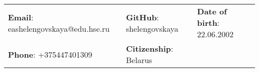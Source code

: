 \documentclass[letterpaper, 11pt]{article}
\begin{document}


\vspace{0.5cm} 
\begin{center}
\begin{tabular}{lll}
\textbf{Email}: eashelengovskaya@edu.hse.ru      &
\hspace{0.1in} \textbf{GitHub}: shelengovskaya    &
\hspace{0.1in} 	\textbf{Date of birth}: 22.06.2002 \\

\textbf{Phone}: +375447401309   & 
\hspace{0.1in} \textbf{Citizenship}: Belarus 
\end{tabular}
\end{center}


\setlength{\tabcolsep}{4pt}
\end{document}
